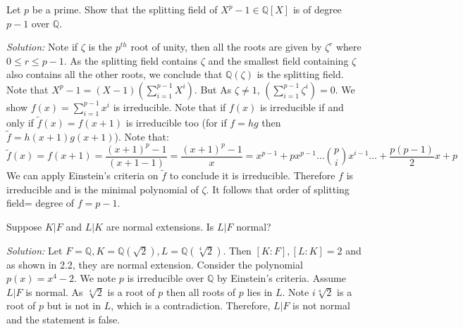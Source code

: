 \documentclass[a4paper, 11pt]{article}
\newenvironment{solution}
    {\textit{Solution:}}
    {}
\begin{document}
\begin{tcolorbox}[colback=c2,colframe=c1,title=Problem 2.6]
    Let $p$ be a prime. Show that the splitting field of $X^{p}-  1 \in\mathbb Q[X]$ is of degree
    $p - 1$ over $\mathbb Q$.
\end{tcolorbox}
\begin{solution}
    Note if $\zeta$ is the $p^{th}$ root of unity, then all the roots are given by $\zeta^r$ where $0\leq r\leq p-1$. As the splitting field contains $\zeta$ and the smallest field containing $\zeta$ also contains all the other roots, we conclude that  $\mathbb Q(\zeta)$ is the splitting field. 
    Note that $X^p-1=(X-1)\left(\sum_{i=1}^{p-1}X^i\right)$. But As $\zeta\ne1$, $\left(\sum_{i=1}^{p-1}\zeta^i\right)=0$. We show $f(x)=\sum_{i=1}^{p-1}x^i$ is irreducible. Note that if $f(x)$ is irreducible if and only if $\tilde{f}(x)=f(x+1)$ is irreducible too (for if $f=hg$ then $\tilde{f}=h(x+1)g(x+1)$). Note that:
    $$\tilde{f}(x)=f(x+1)=\frac{(x+1)^p-1}{(x+1-1)}=\frac{(x+1)
    ^p-1}{x}=x^{p-1}+px^{p-1}\hdots {p\choose i}x^{i-1}\hdots +\frac{p(p-1)}{2}x+p$$ 
    We can apply Einstein's criteria on $\tilde{f}$ to conclude it is irreducible. Therefore $f$ is irreducible and is the minimal polynomial of $\zeta$. It follows that order of splitting field= degree of $f =p-1$.
\end{solution}


\begin{tcolorbox}[colback=c2,colframe=c1,title=Problem 2.7]
    Suppose $K | F$ and $L | K$ are normal extensions. Is $L | F$ normal?
\end{tcolorbox}
\begin{solution}
    Let $F=\mathbb{Q},K=\mathbb{Q}(\sqrt{2}),L=\mathbb{Q}(\sqrt[4]{2})$. Then $[K:F],[L:K]=2$ and as shown in 2.2, they are normal extension. Consider the polynomial $p(x)=x^4-2$. We  note $p$ is irreducible over $\mathbb{Q}$ by Einstein's criteria. Assume $L|F$ is normal. As $\sqrt[4]{2}$ is a root of $p$ then all roots of $p$ lies in $L$. Note $i\sqrt[4]{2}$ is a root of $p$ but is not in $L$, which is a contradiction. Therefore, $L|F$ is not normal and the statement is false.
\end{solution}
\end{document}
